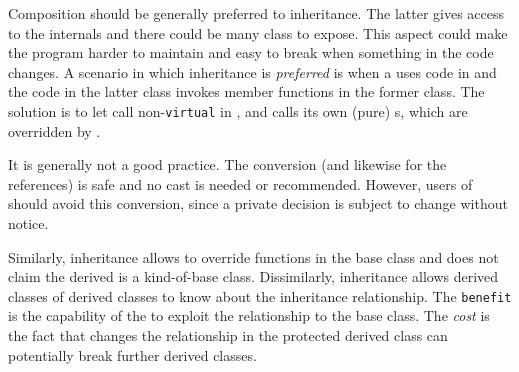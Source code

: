 Composition should be generally preferred to  inheritance. 
The latter gives access to the internals and there could be many class 
to expose. This aspect could make the program harder to maintain and 
easy to break when something in the code changes. 
\newline
A scenario in which  inheritance is \textit{preferred} is 
when a  uses code in  
and the code in the latter class invokes member functions in the former 
class. The solution is to let  call 
non-\texttt{virtual} in , and  
calls its own (pure) s, which are overridden by 
.

It is generally not a good practice.
\newline
The conversion  (and 
likewise for the references) is safe and no cast is needed or 
recommended. However, users of  should avoid 
this conversion, since a private decision is subject to change without 
notice.

Similarly,  inheritance allows to override 
 functions in the base class and does not claim the 
derived is a kind-of-base class.
\newline
Dissimilarly,  inheritance allows derived classes 
of derived classes to know about the inheritance relationship. The 
\texttt{benefit} is the capability of the 
 to exploit the relationship to 
the base class. The \textit{cost} is the fact that changes the relationship 
in the protected derived class can potentially break further derived 
classes.

